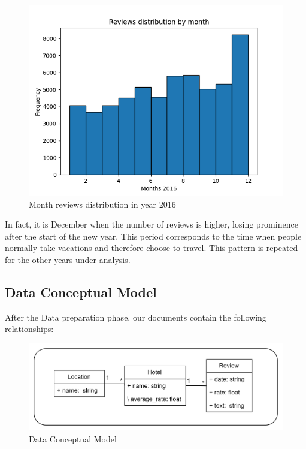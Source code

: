 \documentclass[sigconf]{acmart}
\begin{document}
\begin{figure}[h]
  \centering
  \includegraphics[width=\linewidth]{imgs/date_distributions_2016.png}
  \caption{Month reviews distribution in year 2016}
\end{figure}

In fact, it is December when the number of reviews is higher, losing prominence after the start of the new year. This period corresponds to the time when people normally take vacations and therefore choose to travel. This pattern is repeated for the other years under analysis.

\subsection{Data Conceptual Model}

After the Data preparation phase, our documents contain the following relationships:

\begin{figure}[h]
  \centering
  \includegraphics[width=\linewidth]{imgs/UML.png}
  \caption{Data Conceptual Model}
\end{figure}
\end{document}
